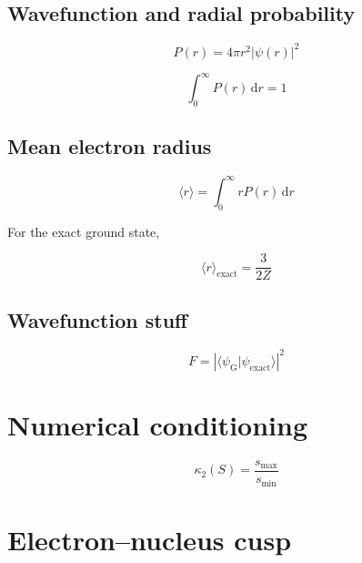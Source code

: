 \subsection{Wavefunction and radial probability}

\begin{equation}
    P(r)=4\pi r^2|\psi(r)|^2
    \label{eq:radial_probability}
\end{equation}

\begin{equation}
    \int_0^\infty P(r)\,\mathrm dr=1
\end{equation}


\subsection{Mean electron radius}

\begin{equation}
    \langle r\rangle=
    \int_0^\infty rP(r)\,\mathrm dr
    \label{eq:mean_radius}
\end{equation}

For the exact ground state,

\begin{equation}
    \langle r\rangle_{\mathrm{exact}}
    =\frac{3}{2Z}
    \label{eq:exact_mean_radius}
\end{equation}


\subsection{Wavefunction stuff}

\begin{equation}
    F=
    \left|
    \langle\psi_{\mathrm G}|
    \psi_{\mathrm{exact}}\rangle
    \right|^2
    \label{eq:fidelity}
\end{equation}


\section{Numerical conditioning}

\begin{equation}
    \kappa_2(S)=
    \frac{s_{\max}}{s_{\min}}
    \label{eq:condition_number}
\end{equation}


\section{Electron--nucleus cusp}

